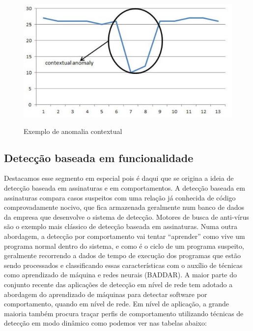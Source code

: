 \begin{figure}[H]
\caption{\small Exemplo de anomalia contextual}
\centering
\includegraphics[scale=0.5]{figs/anomalia_contextual.JPG}
\label{f.contextual}
\end{figure}

\subsection{Detecção baseada em funcionalidade}
\label{ss.deteccao_funcionalidade} Destacamos esse segmento em especial pois é
daqui que se origina a ideia de detecção baseada em assinaturas e em
comportamentos. A detecção baseada em assinaturas compara casos suspeitos com
uma relação já conhecida de código comprovadamente nocivo, que fica armazenada
geralmente num banco de dados da empresa que desenvolve o sistema de detecção.
Motores de busca de anti-vírus são o exemplo mais clássico de detecção baseada
em assinaturas. Numa outra abordagem, a detecção por comportamento vai tentar
``aprender'' como vive um programa normal dentro do sistema, e como é o ciclo
de um programa suspeito, geralmente recorrendo a dados de tempo de execução
dos programas que estão sendo processados e classificando essas
características com o auxílio de técnicas como aprendizado de máquina e redes
neurais (BADDAR). A maior parte do conjunto recente das aplicações de detecção em nível de rede tem adotado a abordagem do aprendizado de máquinas para detectar software por comportamento, quando em nível de rede. Em nível de aplicação, a grande maioria também procura traçar perfis de comportamento utilizando técnicas de detecção em modo dinâmico como podemos ver nas tabelas abaixo:

